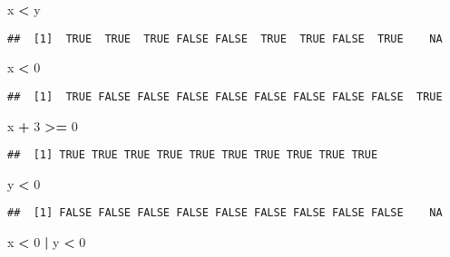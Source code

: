 \documentclass[]{article}
\newenvironment{Shaded}{\begin{snugshade}}{\end{snugshade}}
\newcommand{\DecValTok}[1]{\textcolor[rgb]{0.00,0.00,0.81}{#1}}
\newcommand{\StringTok}[1]{\textcolor[rgb]{0.31,0.60,0.02}{#1}}
\newcommand{\OperatorTok}[1]{\textcolor[rgb]{0.81,0.36,0.00}{\textbf{#1}}}
\newcommand{\NormalTok}[1]{#1}
\begin{document}
\begin{Shaded}
\begin{Highlighting}[]
\NormalTok{x }\OperatorTok{<}\StringTok{ }\NormalTok{y}
\end{Highlighting}
\end{Shaded}

\begin{verbatim}
##  [1]  TRUE  TRUE  TRUE FALSE FALSE  TRUE  TRUE FALSE  TRUE    NA
\end{verbatim}

\begin{Shaded}
\begin{Highlighting}[]
\NormalTok{x }\OperatorTok{<}\StringTok{ }\DecValTok{0}
\end{Highlighting}
\end{Shaded}

\begin{verbatim}
##  [1]  TRUE FALSE FALSE FALSE FALSE FALSE FALSE FALSE FALSE  TRUE
\end{verbatim}

\begin{Shaded}
\begin{Highlighting}[]
\NormalTok{x }\OperatorTok{+}\StringTok{ }\DecValTok{3} \OperatorTok{>=}\StringTok{ }\DecValTok{0}
\end{Highlighting}
\end{Shaded}

\begin{verbatim}
##  [1] TRUE TRUE TRUE TRUE TRUE TRUE TRUE TRUE TRUE TRUE
\end{verbatim}

\begin{Shaded}
\begin{Highlighting}[]
\NormalTok{y }\OperatorTok{<}\StringTok{ }\DecValTok{0}
\end{Highlighting}
\end{Shaded}

\begin{verbatim}
##  [1] FALSE FALSE FALSE FALSE FALSE FALSE FALSE FALSE FALSE    NA
\end{verbatim}

\begin{Shaded}
\begin{Highlighting}[]
\NormalTok{x }\OperatorTok{<}\StringTok{ }\DecValTok{0} \OperatorTok{|}\StringTok{ }\NormalTok{y }\OperatorTok{<}\StringTok{ }\DecValTok{0}
\end{Highlighting}
\end{Shaded}
\end{document}
